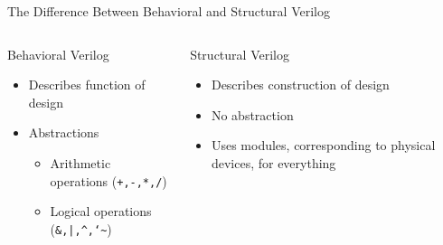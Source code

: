 \documentclass[table,dvipsnames,colorlinks=true]{beamer}
\begin{document}
\begin{frame}{The Difference Between Behavioral and Structural Verilog}
    \begin{columns}
        \begin{column}[T]{0.45\textwidth}
            \begin{block}{Behavioral Verilog}
                \begin{itemize}
                    \item Describes function of design 
                    \item Abstractions
                        \begin{itemize}
                            \item Arithmetic operations (\texttt{+,-,*,/})
                            \item Logical operations
                                (\texttt{\&,|,\^{},\char`\~})
                        \end{itemize}
                \end{itemize}
            \end{block}
        \end{column}
        \begin{column}[T]{0.45\textwidth}
            \begin{block}{Structural Verilog}
                \begin{itemize}
                    \item Describes construction of design
                    \item No abstraction
                    \item Uses modules, corresponding to physical devices, for everything 
                \end{itemize}
            \end{block}
        \end{column}
    \end{columns}
    \begin{block}{}
    \end{block}
\end{frame}
\end{document}
